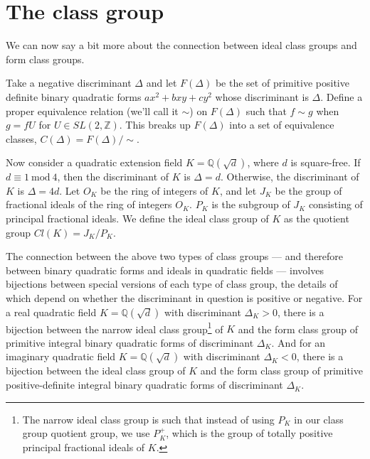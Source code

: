 \documentclass{article}
\theoremstyle{definition}
\theoremstyle{theorem}
\theoremstyle{example}
\theoremstyle{corollary}
\begin{document}
\bigskip








\section{The class group}

\bigskip

We can now say a bit more about the connection between ideal class groups and form class groups.

\bigskip

Take a negative discriminant \(\Delta\) and let \(F ( \Delta)\) be the set of primitive positive definite binary quadratic forms \(ax^{2} + b xy + c y^{2}\) whose discriminant is \(\Delta\). Define a proper equivalence relation (we'll call it \(\sim \)) on \(F (\Delta)\) such that \(f \sim g\) when \(g = fU\) for \(U \in SL(2, \mathbb{Z})\). This breaks up \(F (\Delta)\) into a set of equivalence classes, \(C(\Delta) = F(\Delta) / \sim\).

\bigskip

Now consider a quadratic extension field \(K = \mathbb{Q}(\sqrt{d})\), where \(d\) is square-free. If \(d \equiv 1 \ \textrm{mod} \ 4\), then the discriminant of \(K\) is \(\Delta = d\). Otherwise, the discriminant of \(K\) is \(\Delta = 4d\). Let \(O_{K}\) be the ring of integers of \(K\), and let \(J_{K}\) be the group of fractional ideals of the ring of integers \(O_{K}\). \(P_{K}\) is the subgroup of \(J_{K}\) consisting of principal fractional ideals. We define the ideal class group of \(K\) as the quotient group \(Cl(K) = J_{K} / P_{K}\). %

\bigskip

The connection between the above two types of class groups --- and therefore between binary quadratic forms and ideals in quadratic fields --- involves bijections between special versions of each type of class group, the details of which depend on whether the discriminant in question is positive or negative. For a real quadratic field \(K = \mathbb{Q}(\sqrt{d})\) with discriminant \(\Delta_{K} > 0\), there is a bijection between the narrow ideal class group\footnote{The narrow ideal class group is such that instead of using \(P_{K}\) in our class group quotient group, we use \(P_{K}^{+}\), which is the group of totally positive principal fractional ideals of \(K\).} of \(K\) and the form class group of primitive integral binary quadratic forms of discriminant \(\Delta_{K}\). And for an imaginary quadratic field \(K = \mathbb{Q}(\sqrt{d})\) with discriminant \(\Delta_{K} < 0\), there is a bijection between the ideal class group of \(K\) and the form class group of primitive positive-definite integral binary quadratic forms of discriminant \(\Delta_{K}\).
\end{document}
